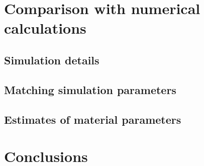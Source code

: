 \section{Comparison with numerical calculations}
\subsection{Simulation details}
\subsection{Matching simulation parameters}
\subsection{Estimates of material parameters}

\section{Conclusions}
